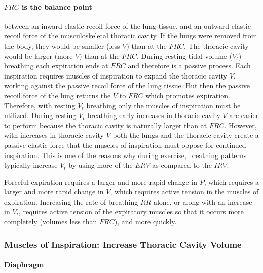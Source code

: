 \paragraph{$FRC$ is the balance point} between an inward elastic recoil force of the lung tissue, and an outward elastic recoil force of the musculoskeletal thoracic cavity. If the lungs were removed from the body, they would be smaller (less $V$) than at the $FRC$. The thoracic cavity would be larger (more $V$) than at the $FRC$. During resting tidal volume ($V_t$) breathing each expiration ends at $FRC$ and therefore is a passive process. Each inspiration requires muscles of inspiration to expand the thoracic cavity $V$, working against the passive recoil force of the lung tissue. But then the passive recoil force of the lung returns the $V$ to $FRC$ which promotes expiration. Therefore, with resting $V_t$ breathing only the muscles of inspiration must be utilized. 
During resting $V_t$ breathing early increases in thoracic cavity $V$ are easier to perform because the thoracic cavity is naturally larger than at $FRC$. However, with increases in thoracic cavity $V$ both the lungs and the thoracic cavity create a passive elastic force that the muscles of inspiration must oppose for continued inspiration. This is one of the reasons why during exercise, breathing patterns typically increase $V_t$ by using more of the $ERV$ as compared to the $IRV$.

Forceful expiration requires a larger and more rapid change in $P$, which requires a larger and more rapid change in $V$, which requires active tension in the muscles of expiration. Increasing the rate of breathing $RR$ alone, or along with an increase in $V_t$, requires active tension of the expiratory muscles so that it occurs more completely (volumes less than $FRC$), and more quickly. 

\subsubsection{Muscles of Inspiration: Increase Thoracic Cavity Volume}

\paragraph{Diaphragm}

